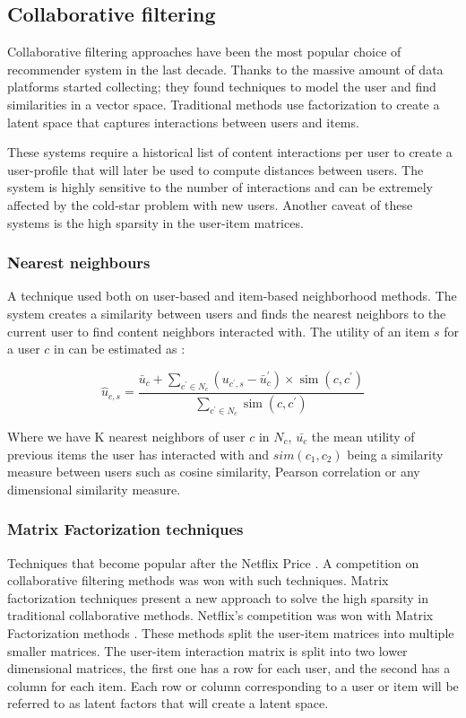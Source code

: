 \documentclass{kththesis}
\begin{document}
\subsection{Collaborative filtering}
Collaborative filtering approaches have been the most popular choice of recommender system in the last decade. Thanks to the massive amount of data platforms started collecting; they found techniques to model the user and find similarities in a vector space. Traditional methods use factorization to create a latent space that captures interactions between users and items.

These systems require a historical list of content interactions per user to create a user-profile that will later be used to compute distances between users. The system is highly sensitive to the number of interactions and can be extremely affected by the cold-star problem with new users. Another caveat of these systems is the high sparsity in the user-item matrices.

\subsubsection{Nearest neighbours}
A technique used both on user-based and item-based neighborhood methods. The system creates a similarity between users and finds the nearest neighbors to the current user to find content neighbors interacted with. The utility of an item $s$ for a user $c$ in can be estimated as \cite{knn}:

\begin{equation}
\hat{u}_{c, s}=\frac{\bar{u}_{c}+\sum_{c^{\prime} \in N_{c}}\left(u_{c^{\prime}, s}-\bar{u}_{c}^{\prime}\right) \times \operatorname{sim}\left(c, c^{\prime}\right)}{\sum_{c^{\prime} \in N_{c}} \operatorname{sim}\left(c, c^{\prime}\right)}
\end{equation}

Where we have K nearest neighbors of user $c$ in $N_c$, $\bar{u_c}$ the mean utility of previous items the user has interacted with and $sim(c_1,c_2)$ being a similarity measure between users such as cosine similarity, Pearson correlation or any dimensional similarity measure.


\subsubsection{Matrix Factorization techniques} \label{als}
Techniques that become popular after the Netflix Price \cite{netflix}. A competition on collaborative filtering methods was won with such techniques. Matrix factorization techniques present a new approach to solve the high sparsity in traditional collaborative methods. Netflix's competition was won with Matrix Factorization methods \cite{matrix}. These methods split the user-item matrices into multiple smaller matrices. The user-item interaction matrix is split into two lower dimensional matrices, the first one has a row for each user, and the second has a column for each item. Each row or column corresponding to a user or item will be referred to as latent factors\cite{latentspace} that will create a latent space.
\end{document}
